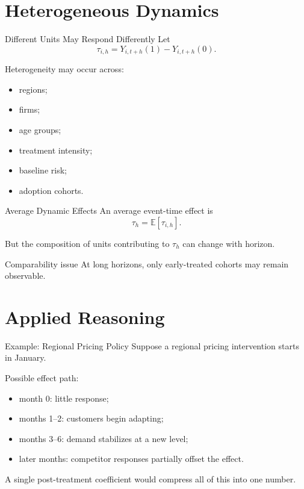 \documentclass[aspectratio=169,11pt]{beamer}
\newcommand{\E}{\mathbb{E}}
\begin{document}
\section{Heterogeneous Dynamics}

\begin{frame}{Different Units May Respond Differently}
Let
\[
\tau_{i,h}
=
Y_{i,t+h}(1)-Y_{i,t+h}(0).
\]

Heterogeneity may occur across:
\begin{itemize}
\item regions;
\item firms;
\item age groups;
\item treatment intensity;
\item baseline risk;
\item adoption cohorts.
\end{itemize}
\end{frame}

\begin{frame}{Average Dynamic Effects}
An average event-time effect is
\[
\tau_h
=
\E[\tau_{i,h}].
\]

But the composition of units contributing to \(\tau_h\) can change with horizon.

\begin{alertblock}{Comparability issue}
At long horizons, only early-treated cohorts may remain observable.
\end{alertblock}
\end{frame}

\section{Applied Reasoning}

\begin{frame}{Example: Regional Pricing Policy}
Suppose a regional pricing intervention starts in January.

Possible effect path:
\begin{itemize}
\item month 0: little response;
\item months 1--2: customers begin adapting;
\item months 3--6: demand stabilizes at a new level;
\item later months: competitor responses partially offset the effect.
\end{itemize}

A single post-treatment coefficient would compress all of this into one number.
\end{frame}
\end{document}
